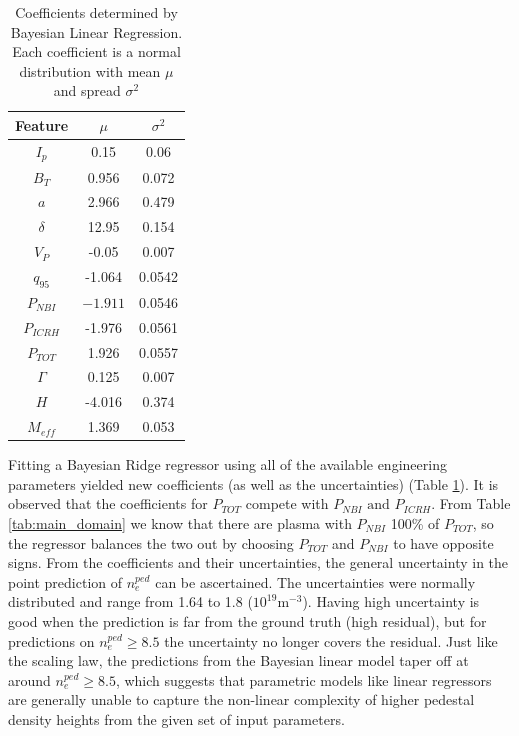 \documentclass[a4paper, twoside, final, 12pt]{article}
\begin{document}
{%
\begin{table}
\centering
\caption{Coefficients determined by Bayesian Linear Regression. Each coefficient is a normal distribution with mean $\mu$ and spread $\sigma^2$}\label{tab:new_coef}
\begin{tabular}{ | c | c | c |}
			\hline
			Feature & $\mu$ & $\sigma^2$ \\
			\hline
			$I_p$ & 0.15 & 0.06 \\
			$B_T$ & 0.956 & 0.072 \\
			$a$ & 2.966 & 0.479 \\
			$\delta$ & 12.95 & 0.154 \\
			$V_P$ & -0.05 & 0.007 \\
			$q_{95}$ & -1.064 & 0.0542 \\
			$P_{NBI}$ & $-1.911$ & 0.0546 \\
			$P_{ICRH}$ & -1.976 & 0.0561 \\
			$P_{TOT}$ & 1.926 & 0.0557 \\
			$\Gamma$ & 0.125 & 0.007 \\
			$H$ & -4.016 & 0.374  \\
			$M_{eff}$ & 1.369 & 0.053 \\
			\hline
\end{tabular}
\end{table}
Fitting a Bayesian Ridge regressor using all of the available engineering parameters yielded new coefficients (as well as the uncertainties) (Table \ref{tab:new_coef}). It is observed that the coefficients for $P_{TOT}$ compete with $P_{NBI} \text{ and }  P_{ICRH}$. From Table \ref{tab:main_domain} we know that there are plasma with $P_{NBI}$ 100\% of $P_{TOT}$, so the regressor balances the two out by choosing $P_{TOT}$ and $P_{NBI}$ to have opposite signs.     
From the coefficients and their uncertainties, the general uncertainty in the point prediction of $n_e^{ped}$ can be ascertained. The uncertainties were normally distributed and range from 1.64 to 1.8 ($10^{19}\text{m}^{-3}$). Having high uncertainty is good when the prediction is far from the ground truth (high residual), but for predictions on $n_e^{ped} \geq 8.5$ the uncertainty no longer covers the residual. 
Just like the scaling law, the predictions from the Bayesian linear model taper off at around $n_e^{ped} \geq 8.5$, which suggests that parametric models like linear regressors are generally unable to capture the non-linear complexity of higher pedestal density heights from the given set of input parameters.
}
\end{document}
